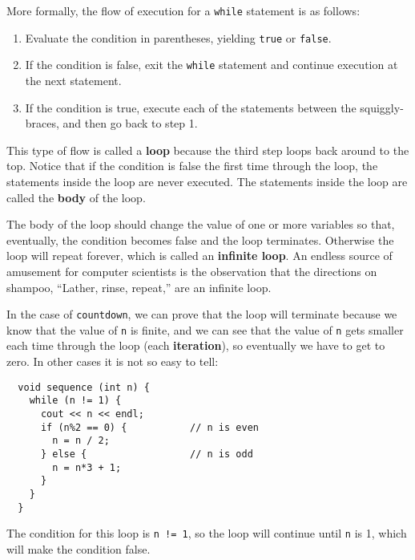 More formally, the flow of execution for a {\tt while} statement
is as follows:

\begin{enumerate}

\item Evaluate the condition in parentheses, yielding {\tt true}
or {\tt false}.

\item If the condition is false, exit the {\tt while} statement
and continue execution at the next statement.

\item If the condition is true, execute each of the statements
between the squiggly-braces, and then go back to step 1.

\end{enumerate}

This type of flow is called a {\bf loop} because the third step loops
back around to the top.  Notice that if the condition is false the
first time through the loop, the statements inside the loop are
never executed.  The statements inside the loop are called
the {\bf body} of the loop.


The body of the loop should change the value of
one or more variables so that, eventually, the condition becomes
false and the loop terminates.  Otherwise the loop will repeat
forever, which is called an {\bf infinite loop}.  An endless
source of amusement for computer scientists is the observation
that the directions on shampoo, ``Lather, rinse, repeat,'' are
an infinite loop.

In the case of {\tt countdown}, we can prove that the loop
will terminate because we know that the value of {\tt n} is
finite, and we can see that the value of {\tt n} gets smaller
each time through the loop (each {\bf iteration}), so
eventually we have to get to zero.  In other cases it is not
so easy to tell:

\begin{lstlisting}
  void sequence (int n) {
    while (n != 1) {
      cout << n << endl;
      if (n%2 == 0) {           // n is even
        n = n / 2;
      } else {                  // n is odd
        n = n*3 + 1;
      }
    }
  }
\end{lstlisting}
%
The condition for this loop is {\tt n != 1}, so the loop
will continue until {\tt n} is 1, which will make the condition
false.

